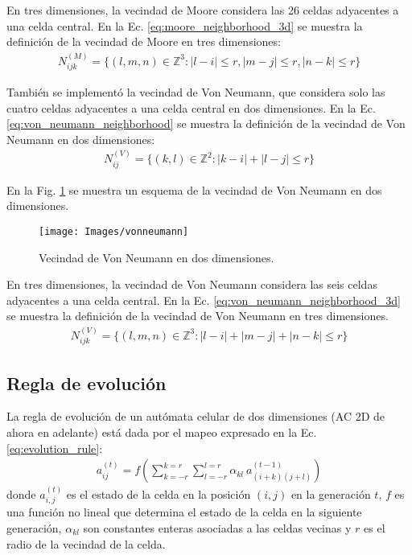 En tres dimensiones, la vecindad de Moore considera las 26 celdas adyacentes a una celda central.
En la Ec. \ref{eq:moore_neighborhood_3d} se muestra la definición de la vecindad de Moore en tres dimensiones:
\begin{equation}
    \label{eq:moore_neighborhood_3d}
    \begin{aligned}
        N^{(M)}_{ijk} = \{(l,m,n) \in \mathbb{Z}^3 : |l-i| \leq r, |m-j| \leq r, |n-k| \leq r\}
    \end{aligned}
\end{equation}

También se implementó la vecindad de Von Neumann, que considera solo las cuatro celdas adyacentes a una celda central en dos dimensiones.
En la Ec. \ref{eq:von_neumann_neighborhood} se muestra la definición de la vecindad de Von Neumann en dos dimensiones:
\begin{equation}
    \label{eq:von_neumann_neighborhood}
    \begin{aligned}
        N^{(V)}_{ij} = \{(k,l) \in \mathbb{Z}^2 : |k-i| + |l-j| \leq r\}
    \end{aligned}
\end{equation}

En la Fig. \ref{fig:vonneumann} se muestra un esquema de la vecindad de Von Neumann en dos dimensiones.
\begin{figure}[H]
    \centering
    \texttt{[image: Images/vonneumann]}
    \caption{Vecindad de Von Neumann en dos dimensiones.}
    \label{fig:vonneumann}
\end{figure}

En tres dimensiones, la vecindad de Von Neumann considera las seis celdas adyacentes a una celda central.
En la Ec. \ref{eq:von_neumann_neighborhood_3d} se muestra la definición de la vecindad de Von Neumann en tres dimensiones.
\begin{equation}
    \label{eq:von_neumann_neighborhood_3d}
    \begin{aligned}
        N^{(V)}_{ijk} = \{(l,m,n) \in \mathbb{Z}^3 : |l-i| + |m-j| + |n-k| \leq r\}
    \end{aligned}
\end{equation}


\subsection{Regla de evolución}
\label{subsec:evolucion}
La regla de evolución de un autómata celular de dos dimensiones (AC 2D de ahora en adelante) está dada por el mapeo expresado en la Ec. \ref{eq:evolution_rule}:
\begin{equation}
    \label{eq:evolution_rule}
    \begin{aligned}
        a_{ij}^{(t)} = f(\sum^{k=r}_{k=-r}\sum^{l=r}_{l=-r}{\alpha_{kl}\ a_{(i+k)(j+l)}^{(t-1)}})
    \end{aligned}
\end{equation}
donde $a_{i,j}^{(t)}$ es el estado de la celda en la posición $(i,j)$ en la generación $t$, $f$ es una función no lineal que determina el estado de la celda en la siguiente generación, $\alpha_{kl}$ son constantes enteras asociadas a las celdas vecinas y $r$ es el radio de la vecindad de la celda.

